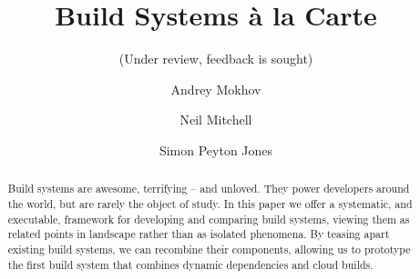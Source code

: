 \documentclass[acmsmall,review]{acmart}\settopmatter{printfolios=true,printccs=false,printacmref=false}
\begin{document}
\title[Build Systems \`a la Carte]{Build Systems \`a la Carte}
\subtitle{(Under review, feedback is sought)}

\author{Andrey Mokhov}

\author{Neil Mitchell}

\author{Simon Peyton Jones}


\begin{abstract}
Build systems are awesome, terrifying -- and unloved.
They power developers around the world, but are rarely the object of study.
In this paper we offer a systematic, and executable, framework for developing and comparing
build systems, viewing them as related points in landscape rather than as isolated phenomena.
By teasing apart existing build systems, we can recombine their components,
allowing us to prototype the first build
system that combines dynamic dependencies and cloud builds.
\end{abstract}
\end{document}
